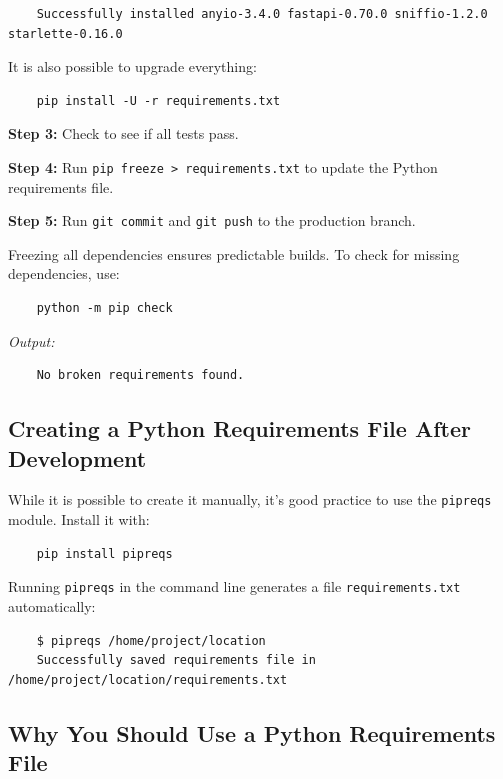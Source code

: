 \begin{verbatim}
	Successfully installed anyio-3.4.0 fastapi-0.70.0 sniffio-1.2.0 starlette-0.16.0
\end{verbatim}

It is also possible to upgrade everything:

\begin{verbatim}
	pip install -U -r requirements.txt
\end{verbatim}

\textbf{Step 3:} Check to see if all tests pass.

\textbf{Step 4:} Run \texttt{pip freeze > requirements.txt} to update the Python requirements file.

\textbf{Step 5:} Run \texttt{git commit} and \texttt{git push} to the production branch.

Freezing all dependencies ensures predictable builds. To check for missing dependencies, use:

\begin{verbatim}
	python -m pip check
\end{verbatim}

\textit{Output:}

\begin{verbatim}
	No broken requirements found.
\end{verbatim}

\subsection{Creating a Python Requirements File After Development}

While it is possible to create it manually, it's good practice to use the \texttt{pipreqs} module. Install it with:

\begin{verbatim}
	pip install pipreqs
\end{verbatim}

Running \texttt{pipreqs} in the command line generates a file \texttt{requirements.txt} automatically:

\begin{verbatim}
	$ pipreqs /home/project/location
	Successfully saved requirements file in /home/project/location/requirements.txt
\end{verbatim}

\subsection{Why You Should Use a Python Requirements File}

